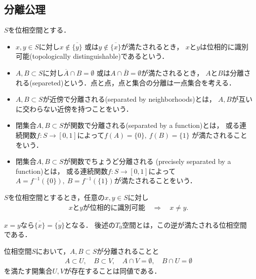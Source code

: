 \subsection{分離公理}
	\begin{screen}
		\begin{dfn}[位相的に識別可能・分離]
			$S$を位相空間とする．
			\begin{itemize}
				\item $x,y \in S$に対し$x \notin \overline{\{y\}}$
					或は$y \notin \overline{\{x\}}$が満たされるとき，
					$x$と$y$は位相的に識別可能(topologically distinguishable)であるという．
				\item $A,B \subset S$に対し$\overline{A} \cap B = \emptyset$
					或は$A \cap \overline{B} = \emptyset$が満たされるとき，
					$A$と$B$は分離される(separeted)という．点と点，点と集合の分離は一点集合を考える．
				\item $A,B \subset S$が近傍で分離される(separated by neighborhoods)とは，
					$A,B$が互いに交わらない近傍を持つことをいう．
				\item 閉集合$A,B \subset S$が関数で分離される(separated by a function)とは，
					或る連続関数$f:S \longrightarrow [0,1]$によって$f(A) = \{0\},\ f(B) = \{1\}$
					が満たされることをいう．
				\item 閉集合$A,B \subset S$が関数でちょうど分離される
					(precisely separated by a function)とは，
					或る連続関数$f:S \longrightarrow [0,1]$によって
					$A = f^{-1}(\{0\}),\ B = f^{-1}(\{1\})$が満たされることをいう．
			\end{itemize}
		\end{dfn}
	\end{screen}
	
	\begin{screen}
		\begin{thm}[位相的に識別可能な二点は相異なる]
			$S$を位相空間とするとき，任意の$x,y \in S$に対し
			\begin{align}
				\mbox{$x$と$y$が位相的に識別可能} \quad \Longrightarrow \quad
				x \neq y .
			\end{align}
		\end{thm}
	\end{screen}
	
	\begin{prf}
		$x = y$なら$\overline{\{x\}} = \overline{\{y\}}$となる．
		後述の$T_0$空間とは，この逆が満たされる位相空間である．
		\QED
	\end{prf}
	
	\begin{screen}
		\begin{thm}[分離される集合は他方を含まない近傍を持つ]
		\label{thm:the_equivalent_condition_of_separatedness}
			位相空間$S$において，$A,B \subset S$が分離されることと
			\begin{align}
				A \subset U,\quad B \subset V,\quad 
				A \cap V = \emptyset,
				\quad B \cap U = \emptyset
				\label{eq:thm_the_equivalent_condition_of_separatedness}
			\end{align}
			を満たす開集合$U,V$が存在することは同値である．
		\end{thm}
	\end{screen}
	
